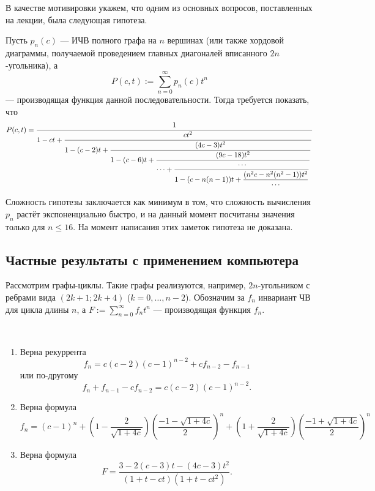 \documentclass[12pt,a4paper]{article}
\begin{document}
    В качестве мотивировки укажем, что одним из основных вопросов, поставленных на лекции, была следующая гипотеза.
    \begin{hypothesis}
        Пусть $p_n(c)$ --- ИЧВ полного графа на $n$ вершинах (или также хордовой диаграммы, получаемой проведением главных диагоналей вписанного $2n$-угольника), а
        \[P(c, t) := \sum_{n=0}^\infty p_n(c) t^n\]
        --- производящая функция данной последовательности. Тогда требуется показать, что
        \[
            P(c, t) =
            \dfrac{1}{
                1 - ct + \dfrac{ct^2}{
                    1 - (c-2)t + \dfrac{(4c-3)t^2}{
                        1 - (c-6)t + \dfrac{(9c-18)t^2}{
                            \dots + \dfrac{\mathstrut\cdots}{
                                1 - (c - n(n-1))t + \dfrac{(n^2 c - n^2(n^2 - 1))t^2}{
                                    \cdots
                                }
                            }
                        }
                    }
                }
            }
        \] 
    \end{hypothesis}
    Сложность гипотезы заключается как минимум в том, что сложность вычисления $p_n$ растёт экспоненциально быстро, и на данный момент посчитаны значения только для $n \leqslant 16$. На момент написания этих заметок гипотеза не доказана.

    \subsection{Частные результаты с применением компьютера}

    \begin{definition}
        Рассмотрим графы-циклы. Такие графы реализуются, например, $2n$-уголь\-ни\-ком с ребрами вида $(2k+1; 2k+4)$ ($k = 0, \dots, n-2$). Обозначим за $f_n$ инвариант ЧВ для цикла длины $n$, а $F := \sum_{n=0}^\infty f_n t^n$ --- производящая функция $f_n$.
    \end{definition}

    \begin{lemma}\ 
        \begin{enumerate}
            \item Верна рекуррента
                \[f_n = c (c-2) (c-1)^{n-2} + c f_{n-2} - f_{n-1}\]
                или по-другому
                \[f_n + f_{n-1} - c f_{n-2} = c (c-2) (c-1)^{n-2}.\]
            \item Верна формула
                \[f_n = (c-1)^n + \left(1 - \frac{2}{\sqrt{1+4c}}\right)\left(\frac{-1 - \sqrt{1+4c}}{2}\right)^n + \left(1 + \frac{2}{\sqrt{1+4c}}\right)\left(\frac{-1 + \sqrt{1+4c}}{2}\right)^n\]
            \item Верна формула
                \[F = \frac{3 - 2 (c-3) t - (4c-3) t^2}{(1 + t - ct)(1 + t - ct^2)}.\]
        \end{enumerate}
    \end{lemma}
\end{document}
